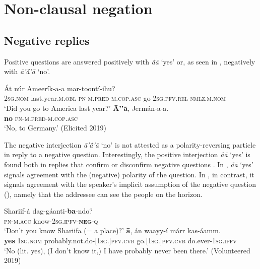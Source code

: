\documentclass[output=paper,colorlinks,citecolor=brown,draftmode
]{langscibook}
\begin{document}
\section{Non-clausal negation}\label{sec:treis:3}
\subsection{Negative replies}\label{sec:treis:3.1}

Positive questions are answered positively with \textit{\'āā} ‘yes’ or, as seen in , negatively with \textit{ā’\'ā’ā} ‘no’.    
    



\ea\label{ex:treis:32}
    \begin{xlist}[B: ]
        \gll Át	núr Ameerík-a-a mar-toontí-ihu?	\\
        \textsc{2sg.nom} last.year.\textsc{m.obl} \textsc{pn-m.pred-m.cop.asc} go-\textsc{2sg.pfv.rel-nmlz.m.nom} {}	\\
        \glt ‘Did you go to America last year?’ 
        \gll \textbf{Ā’{\abf}’ā},	Jermán-a-a.\\
        \textbf{no} \textsc{pn-m.pred-m.cop.asc}\\
        \glt ‘No, to Germany.’ (Elicited 2019) 
    \end{xlist}
\z %

The negative interjection \textit{ā’\'ā’ā} ‘no’ is not attested as a polarity-reversing particle in reply to a negative question. Interestingly, the positive interjection \textit{\'āā} ‘yes’ is found both in replies that confirm  or disconfirm negative questions . In , \textit{\'āā} ‘yes’ signals agreement with the (negative) polarity of the question. In , in contrast, it signals agreement with the speaker’s implicit assumption of the negative question (), namely that the addressee can see the people on the horizon.

\ea\label{ex:treis:33} %
    \begin{xlist}[B: ]
        \gll Shariif-á 	dag-gáanti-\textbf{ba}-ndo? \\ 
        \textsc{pn-m.acc}	know-\textsc{2sg.ipfv-\textbf{neg}-q} \\
        \glt ‘Don’t you know Shariifa (= a place)?’ 
        \gll \textbf{{\Abf}ā}, án waayy-í márr kas-áamm.\\
    	\textbf{yes}	\textsc{1sg.nom}	probably.not.do-\textsc{[1sg.]pfv.cvb}	go.\textsc{[1sg.]pfv.cvb}	do.ever-\textsc{1sg.ipfv}\\
        \glt ‘No (lit. yes), (I don’t know it,) I have probably never been there.’  (Volunteered 2019)
    \end{xlist}
\z 
\end{document}
